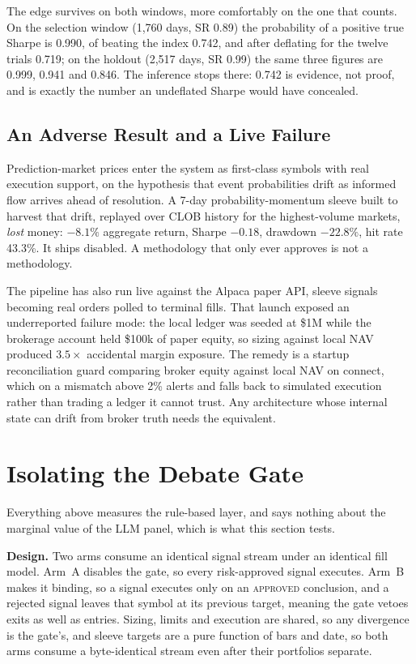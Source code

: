 \documentclass[conference]{IEEEtran}
\begin{document}
The edge survives on both windows, more comfortably on the one that counts. On
the selection window (1{,}760 days, SR 0.89) the probability of a positive true
Sharpe is 0.990, of beating the index 0.742, and after deflating for the twelve
trials 0.719; on the holdout (2{,}517 days, SR 0.99) the same three figures are
0.999, 0.941 and 0.846. The inference stops there: 0.742 is evidence, not
proof, and is exactly the number an undeflated Sharpe would have concealed.

\subsection{An Adverse Result and a Live Failure}
\label{sec:polymarket}

Prediction-market prices enter the system as first-class symbols with real
execution support, on the hypothesis that event probabilities drift as informed
flow arrives ahead of resolution. A 7-day probability-momentum sleeve built to
harvest that drift, replayed over CLOB history for the highest-volume markets,
\emph{lost} money: $-8.1\%$ aggregate return, Sharpe $-0.18$, drawdown
$-22.8\%$, hit rate 43.3\%. It ships disabled. A methodology that only ever
approves is not a methodology.

The pipeline has also run live against the Alpaca paper API, sleeve signals
becoming real orders polled to terminal fills. That launch exposed an
underreported failure mode: the local ledger was seeded at \$1M while the
brokerage account held \$100k of paper equity, so sizing against local NAV
produced $3.5\times$ accidental margin exposure. The remedy is a startup
reconciliation guard comparing broker equity against local NAV on connect,
which on a mismatch above 2\% alerts and falls back to simulated execution
rather than trading a ledger it cannot trust. Any architecture whose internal
state can drift from broker truth needs the equivalent.

\section{Isolating the Debate Gate}
\label{sec:aitest}

Everything above measures the rule-based layer, and says nothing about the
marginal value of the LLM panel, which is what this section tests.

\textbf{Design.} Two arms consume an identical signal stream under an identical
fill model. Arm~A disables the gate, so every risk-approved signal executes.
Arm~B makes it binding, so a signal executes only on an \textsc{approved}
conclusion, and a rejected signal leaves that symbol at its previous target,
meaning the gate vetoes exits as well as entries. Sizing, limits and execution
are shared, so any divergence is the gate's, and sleeve targets are a pure
function of bars and date, so both arms consume a byte-identical stream even
after their portfolios separate.
\end{document}
